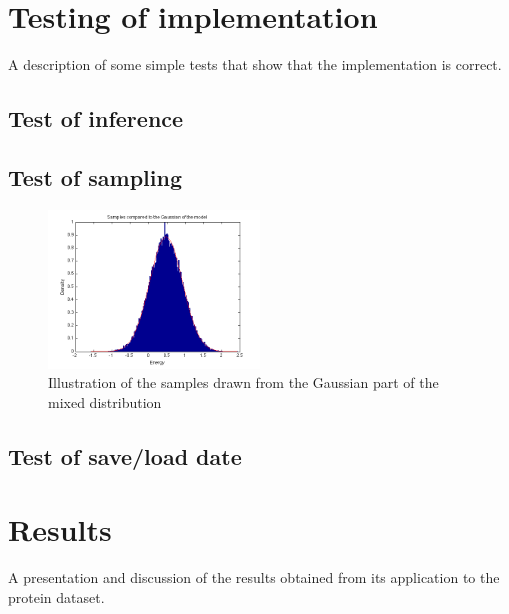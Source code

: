 \documentclass[10pt, conference, compsocconf,a4paper]{IEEEtran}
\begin{document}

\section{Testing of implementation} %
\label{sec:testing_of_implementation}
A description of some simple tests that show that the implementation is correct. 
\subsection{Test of inference} %
\label{sub:test_of_inference}


\subsection{Test of sampling} %
\label{sub:test_of_sampling}


\begin{figure}[ht]
\centering
\includegraphics[width=0.5\textwidth]{figures/fig1.png}
\caption{Illustration of the samples drawn from the Gaussian part of the mixed distribution}
\label{label}
\end{figure}


\subsection{Test of save/load date} %
\label{sub:test_of_save_load_date}



\section{Results} %
\label{sec:results}
A presentation and discussion of the results obtained from its application to the protein dataset.
\end{document}
